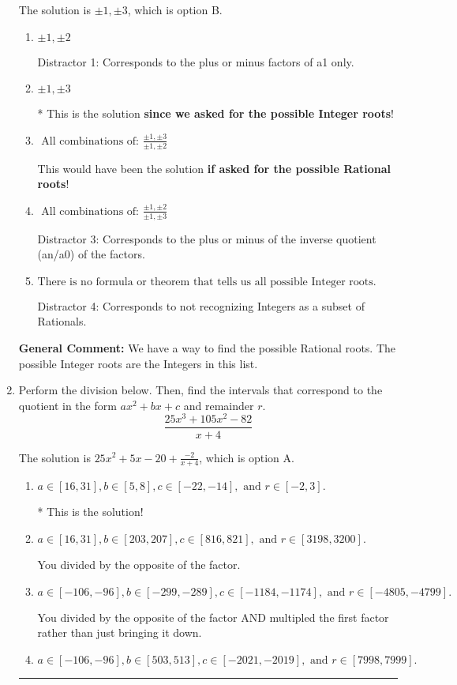 \documentclass{extbook}[14pt]
\newcommand{\litem}[1]{\item #1

\rule{\textwidth}{0.4pt}}
\begin{document}
\begin{enumerate}
{The solution is \( \pm 1,\pm 3 \), which is option B.\begin{enumerate}[label=\Alph*.]
\item \( \pm 1,\pm 2 \)

 Distractor 1: Corresponds to the plus or minus factors of a1 only.
\item \( \pm 1,\pm 3 \)

* This is the solution \textbf{since we asked for the possible Integer roots}!
\item \( \text{ All combinations of: }\frac{\pm 1,\pm 3}{\pm 1,\pm 2} \)

This would have been the solution \textbf{if asked for the possible Rational roots}!
\item \( \text{ All combinations of: }\frac{\pm 1,\pm 2}{\pm 1,\pm 3} \)

 Distractor 3: Corresponds to the plus or minus of the inverse quotient (an/a0) of the factors. 
\item \( \text{There is no formula or theorem that tells us all possible Integer roots.} \)

 Distractor 4: Corresponds to not recognizing Integers as a subset of Rationals.
\end{enumerate}

\textbf{General Comment:} We have a way to find the possible Rational roots. The possible Integer roots are the Integers in this list.
}
\litem{
Perform the division below. Then, find the intervals that correspond to the quotient in the form $ax^2+bx+c$ and remainder $r$.
\[ \frac{25x^{3} +105 x^{2} -82}{x + 4} \]

The solution is \( 25x^{2} +5 x -20 + \frac{-2}{x + 4} \), which is option A.\begin{enumerate}[label=\Alph*.]
\item \( a \in [16, 31], b \in [5, 8], c \in [-22, -14], \text{ and } r \in [-2, 3]. \)

* This is the solution!
\item \( a \in [16, 31], b \in [203, 207], c \in [816, 821], \text{ and } r \in [3198, 3200]. \)

 You divided by the opposite of the factor.
\item \( a \in [-106, -96], b \in [-299, -289], c \in [-1184, -1174], \text{ and } r \in [-4805, -4799]. \)

 You divided by the opposite of the factor AND multipled the first factor rather than just bringing it down.
\item \( a \in [-106, -96], b \in [503, 513], c \in [-2021, -2019], \text{ and } r \in [7998, 7999]. \)


\end{enumerate}}
\end{enumerate}
\end{document}
